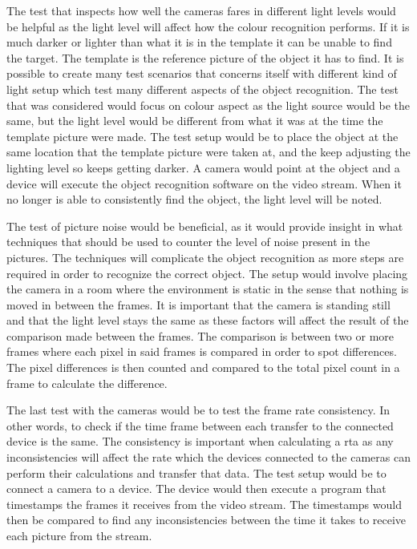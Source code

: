The test that inspects how well the cameras fares in different light levels would be helpful as the light level will affect how the colour recognition performs. If it is much darker or lighter than what it is in the template it can be unable to find the target. The template is the reference picture of the object it has to find. It is possible to create many test scenarios that concerns itself with different kind of light setup which test many different aspects of the object recognition. The test that was considered would focus on colour aspect as the light source would be the same, but the light level would be different from what it was at the time the template picture were made. The test setup would be to place the object at the same location that the template picture were taken at, and the keep adjusting the lighting level so keeps getting darker. A camera would point at the object and a device will execute the object recognition software on the video stream. When it no longer is able to consistently find the object, the light level will be noted.

The test of picture noise would be beneficial, as it would provide insight in what techniques that should be used to counter the level of noise present in the pictures. The techniques will complicate the object recognition as more steps are required in order to recognize the correct object. The setup would involve placing the camera in a room where the environment is static in the sense that nothing is moved in between the frames. It is important that the camera is standing still and that the light level stays the same as these factors will affect the result of the comparison made between the frames. The comparison is between two or more frames where each pixel in said frames is compared in order to spot differences. The pixel differences is then counted and compared to the total pixel count in a frame to calculate the \textperthousand difference.

The last test with the cameras would be to test the frame rate consistency. In other words, to check if the time frame between each transfer to the connected device is the same. The consistency is important when calculating a \gls{rta} as any inconsistencies will affect the rate which the devices connected to the cameras can perform their calculations and transfer that data. The test setup would be to connect a camera to a device. The device would then execute a program that timestamps the frames it receives from the video stream. The timestamps would then be compared to find any inconsistencies between the time it takes to receive each picture from the stream.

